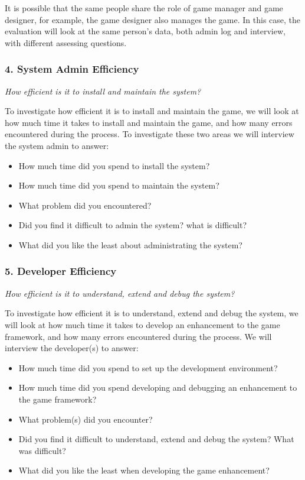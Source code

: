 \documentclass{sigchi}
\begin{document}
It is possible that the same people share the role of game manager and
game designer, for example, the game designer also manages the
game. In this case, the evaluation will look at the same person's
data, both admin log and interview, with different assessing
questions.

\subsubsection{4. System Admin Efficiency}

\emph{How efficient is it to install and maintain the system?}

To investigate how efficient it is to install and maintain
the game, we will look at how much time it takes to install and
maintain the game, and how many errors encountered during the
process. To investigate these two areas we will interview the system
admin to answer:
\begin{itemize}
\item How much time did you spend to install the system?
\item How much time did you spend to maintain the system?
\item What problem did you encountered?
\item Did you find it difficult to admin the system? what is difficult?
\item What did you like the least about administrating the system?
\end{itemize}

\subsubsection{5. Developer Efficiency}

\emph{How efficient is it to understand, extend and debug the system?}

To investigate how efficient it is to understand, extend and debug the
system, we will look at how much time it takes to develop an
enhancement to the game framework, and how many errors encountered
during the process. We will interview the developer(s) to
answer:
\begin{itemize}
\item How much time did you spend to set up the development
  environment?
\item How much time did you spend developing and debugging an
  enhancement to the game framework?
\item What problem(s) did you encounter?
\item Did you find it difficult to understand, extend and debug the
  system? What was difficult?
\item What did you like the least when developing the game
  enhancement? 
\end{itemize}
\end{document}
